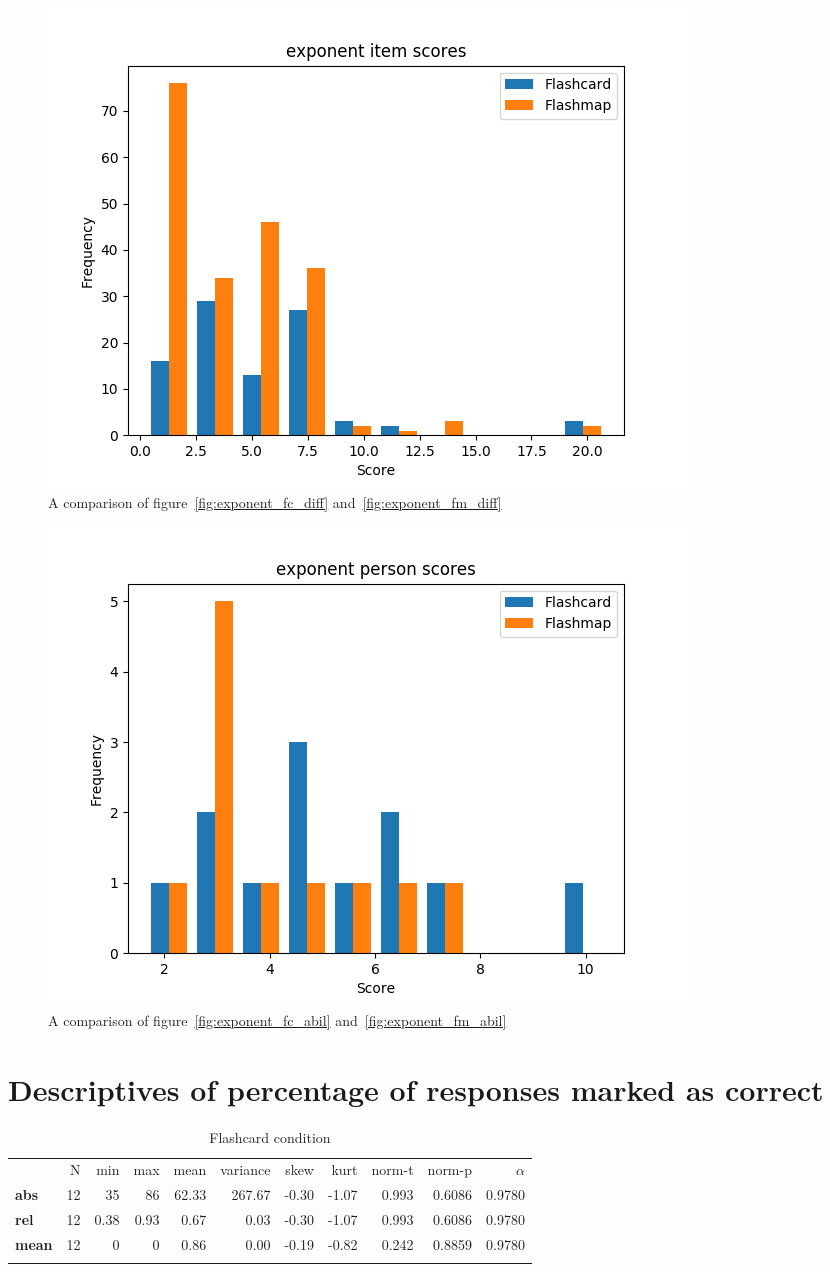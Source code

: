 \begin{figure}
    \centering
    \includegraphics[width=.7\textwidth]{img/exponent_diff.png}
    \caption{A comparison of figure~\protect\ref{fig:exponent_fc_diff} and~\protect\ref{fig:exponent_fm_diff}}
    \label{fig:exponent_diff}
\end{figure}
\begin{figure}
    \centering
    \includegraphics[width=.7\textwidth]{img/exponent_abil.png}
    \caption{A comparison of figure~\protect\ref{fig:exponent_fc_abil} and~\protect\ref{fig:exponent_fm_abil}}
    \label{fig:exponent_abil}
\end{figure}

\FloatBarrier
\section{Descriptives of percentage of responses marked as correct}

\begin{longtable}[c]{@{}lrrrrrrrrrr@{}}
\caption{Flashcard condition}
\endfirsthead
\toprule\addlinespace
& N & min & max & mean & variance & skew & kurt & norm-t &
norm-p & $\alpha$
\\\addlinespace
\midrule
\textbf{abs} & 12 & 35 & 86 & 62.33 & 267.67 & -0.30 & -1.07 & 0.993 &
0.6086 & 0.9780
\\\addlinespace
\textbf{rel} & 12 & 0.38 & 0.93 & 0.67 & 0.03 & -0.30 & -1.07 & 0.993 & 0.6086
& 0.9780
\\\addlinespace
\textbf{mean} & 12 & 0 & 0 & 0.86 & 0.00 & -0.19 & -0.82 & 0.242 &
0.8859 & 0.9780
\\\addlinespace
\bottomrule
    \label{tab:score_fc}
\end{longtable}

